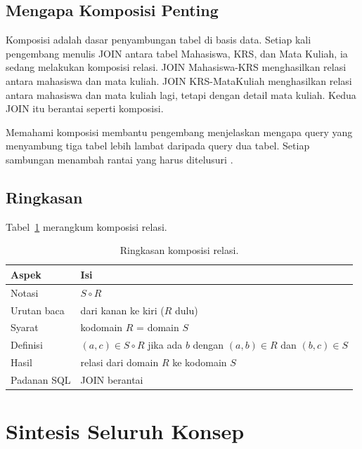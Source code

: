 \documentclass[11pt,a4paper]{article}
\begin{document}
\subsection{Mengapa Komposisi Penting}

Komposisi adalah dasar penyambungan tabel di basis data. Setiap kali pengembang menulis JOIN antara tabel Mahasiswa, KRS, dan Mata Kuliah, ia sedang melakukan komposisi relasi. JOIN Mahasiswa-KRS menghasilkan relasi antara mahasiswa dan mata kuliah. JOIN KRS-MataKuliah menghasilkan relasi antara mahasiswa dan mata kuliah lagi, tetapi dengan detail mata kuliah. Kedua JOIN itu berantai seperti komposisi.

Memahami komposisi membantu pengembang menjelaskan mengapa query yang menyambung tiga tabel lebih lambat daripada query dua tabel. Setiap sambungan menambah rantai yang harus ditelusuri \cite{silberschatz}.

\subsection{Ringkasan}

Tabel~\ref{tab:komposisi} merangkum komposisi relasi.

\begin{table}[H]
	\centering
	\caption{Ringkasan komposisi relasi.}
	\label{tab:komposisi}
	\small
	\begin{tabularx}{\textwidth}{l X}
		\toprule
		Aspek       & Isi                                                                       \\
		\midrule
		Notasi      & $S \circ R$                                                               \\
		Urutan baca & dari kanan ke kiri ($R$ dulu)                                             \\
		Syarat      & kodomain $R$ = domain $S$                                                 \\
		Definisi    & $(a,c) \in S \circ R$ jika ada $b$ dengan $(a,b) \in R$ dan $(b,c) \in S$ \\
		Hasil       & relasi dari domain $R$ ke kodomain $S$                                    \\
		Padanan SQL & JOIN berantai                                                             \\
		\bottomrule
	\end{tabularx}
\end{table}

\section{Sintesis Seluruh Konsep}
\end{document}
